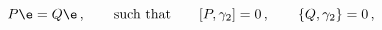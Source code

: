 \begin{equation} \label{esquematic}
P\e=Q\e   \,, \qquad \mbox{such that}\qquad [P,\gamma_2]=0 \,,\qquad
\{Q,\gamma_2\}=0\,,
\end{equation}

